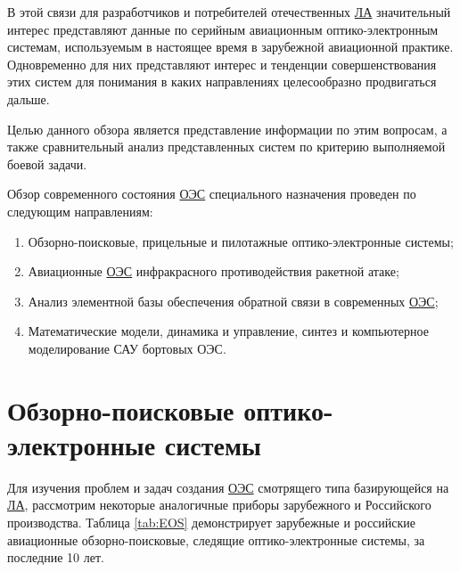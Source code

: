 
В этой связи для разработчиков и потребителей отечественных  \hyperref[acroLA]{ЛА} значительный интерес представляют данные по серийным авиационным оптико-электронным системам, используемым в настоящее время в зарубежной авиационной практике. Одновременно для них представляют интерес и тенденции совершенствования этих систем для понимания в каких направлениях целесообразно продвигаться дальше. 

Целью данного обзора является представление информации по этим вопросам, а также сравнительный анализ представленных систем по критерию выполняемой боевой задачи. 

Обзор современного состояния \hyperref[acroEOS]{ОЭС} специального назначения проведен по следующим направлениям:
\begin{enumerate}
	\item Обзорно-поисковые, прицельные и пилотажные оптико-электронные системы;
	\item Авиационные \hyperref[acroEOS]{ОЭС} инфракрасного противодействия ракетной атаке;
	\item Анализ элементной базы обеспечения обратной связи в современных  \hyperref[acroEOS]{ОЭС};
	\item Математические модели, динамика и управление, синтез и компьютерное моделирование САУ бортовых ОЭС.
\end{enumerate}

\section{Обзорно-поисковые оптико-электронные системы} \label{sec:ch1/sec1-}

Для изучения проблем и задач создания  \hyperref[acroEOS]{ОЭС} смотрящего типа базирующейся на  \hyperref[acroLA]{ЛА}, рассмотрим некоторые аналогичные приборы зарубежного и Российского производства. Таблица \ref{tab:EOS} демонстрирует зарубежные и российские авиационные обзорно-поисковые, следящие оптико-электронные системы, за последние 10 лет. 

